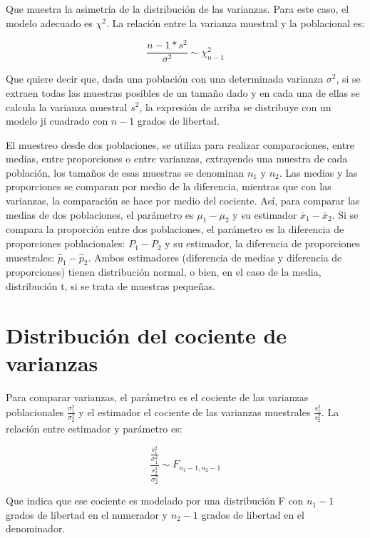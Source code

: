 \documentclass[]{book}
\begin{document}
Que muestra la asimetría de la distribución de las varianzas. Para este
caso, el modelo adecuado es \(\chi^{2}\). La relación entre la varianza
muestral y la poblacional es:

\[\frac{n - 1*s^{2}}{\sigma^{2}} \sim \chi_{n - 1}^{2}\]

Que quiere decir que, dada una población con una determinada varianza
\(\sigma^{2}\), si se extraen todas las muestras posibles de un tamaño
dado y en cada una de ellas se calcula la varianza muestral \(s^{2}\), la
expresión de arriba se distribuye con un modelo ji cuadrado con \(n-1\)
grados de libertad.

El muestreo desde dos poblaciones, se utiliza para realizar
comparaciones, entre medias, entre proporciones o entre varianzas,
extrayendo una muestra de cada población, los tamaños de esas muestras
se denominan \(n_{1}\) y \(n_{2}\). Las medias y las proporciones se
comparan por medio de la diferencia, mientras que con las varianzas, la
comparación se hace por medio del cociente. Así, para comparar las
medias de dos poblaciones, el parámetro es \(\mu_{1} - \mu_{2}\) y su
estimador \({\overline{x}}_{1} - {\overline{x}}_{2}\). Si se compara la
proporción entre dos poblaciones, el parámetro es la diferencia de
proporciones poblacionales: \(P_{1} - P_{2}\) y su estimador, la
diferencia de proporciones muestrales:
\({\widehat{p}}_{1} - {\widehat{p}}_{2}\). Ambos estimadores (diferencia
de medias y diferencia de proporciones) tienen distribución normal, o
bien, en el caso de la media, distribución t, si se trata de muestras
pequeñas.

\hypertarget{distribuciuxf3n-del-cociente-de-varianzas}{%
\section{Distribución del cociente de varianzas}\label{distribuciuxf3n-del-cociente-de-varianzas}}

Para comparar varianzas, el parámetro es el cociente de las varianzas
poblacionales \(\frac{\sigma_{1}^{2}}{\sigma_{2}^{2}}\) y el estimador el
cociente de las varianzas muestrales \(\frac{s_{1}^{2}}{s_{2}^{2}}\). La
relación entre estimador y parámetro es:

\[\frac{\frac{s_{1}^{2}}{\sigma_{1}^{2}}}{\frac{s_{2}^{2}}{\sigma_{2}^{2}}} \sim F_{n_{1} - 1,n_{2} - 1}\]

Que indica que ese cociente es modelado por una distribución F con
\(n_{1} - 1\) grados de libertad en el numerador y \(n_{2} - 1\) grados de
libertad en el denominador.
\end{document}
